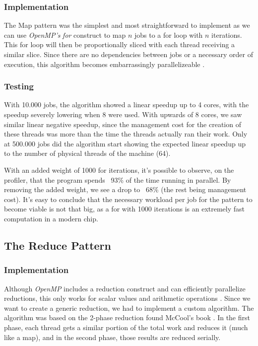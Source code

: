\documentclass[10pt,journal]{IEEEtran}
\begin{document}
\subsubsection{Implementation}

The Map pattern was the simplest and most straightforward to implement as we can use \textit{OpenMP's} \textit{for} construct to map $ n $ jobs to a for loop with $ n $ iterations. This for loop will then be proportionally sliced with each thread receiving a similar slice. Since there are no dependencies between jobs or a necessary order of execution, this algorithm becomes embarrassingly parallelizeable \cite{mccool}.

\subsubsection{Testing}

With 10.000 jobs, the algorithm showed a linear speedup up to 4 cores, with the speedup severely lowering when 8 were used. With upwards of 8 cores, we saw similar linear negative speedup, since the management cost for the creation of these threads was more than the time the threads actually ran their work. Only at 500.000 jobs did the algorithm start showing the expected linear speedup  up to the number of physical threads of the machine (64).

With an added weight of 1000 for iterations, it's possible to observe, on the profiler, that the program spends ~93\% of the time running in parallel. By removing the added weight, we see a drop to ~68\% (the rest being management cost). It's easy to conclude that the necessary workload per job for the pattern to become viable is not that big, as a for with 1000 iterations is an extremely fast computation in a modern chip.

\subsection{The Reduce Pattern}
\label{reduce}

\subsubsection{Implementation}

Although \textit{OpenMP} includes a reduction construct and can efficiently parallelize reductions, this only works for scalar values and arithmetic operations \cite{ompreduct}. Since we want to create a generic reduction, we had to implement a custom algorithm. The algorithm was based on the 2-phase reduction found McCool's book \cite{mccool}. In the first phase, each thread gets a similar portion of the total work and reduces it (much like a map), and in the second phase, those results are reduced serially. 
\end{document}
